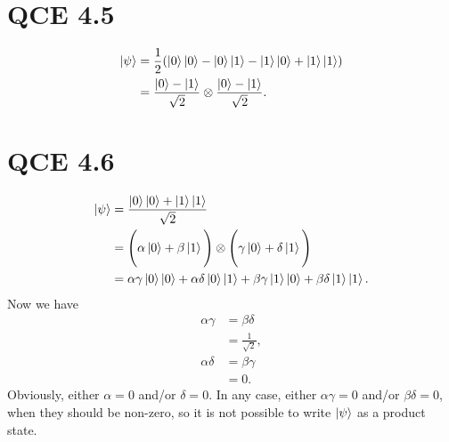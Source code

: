 \documentclass[10pt]{article}
\begin{document}
\section*{QCE 4.5}
\begin{align*}
\ket{\psi} &= \frac{1}{2} ( \ket{0} \ket{0} - \ket{0} \ket{1} - \ket{1} \ket{0} + \ket{1} \ket{1} ) \\
				&= \frac{ \ket{ 0 } - \ket{ 1 } }{\sqrt{2}} \otimes \frac{ \ket{ 0 } - \ket{ 1 } }{\sqrt{2}}.
\end{align*}

\section*{QCE 4.6}
\begin{align*}
\ket{\psi} &= \frac{\ket{0} \ket{0} + \ket{1} \ket{1}}{\sqrt{2}} \\
				&= \Bigg( \alpha \ket{0} + \beta \ket{1} \Bigg) \otimes \Bigg( \gamma \ket{0} + \delta \ket{1} \Bigg) \\
				&= \alpha \gamma \ket{0} \ket{0} + \alpha \delta \ket{0} \ket{1} + \beta \gamma \ket{1} \ket{0} + \beta \delta \ket{1} \ket{1}.
\end{align*}
Now we have
\begin{align*}
\alpha \gamma &= \beta \delta \\
						 &= \frac{1}{\sqrt{2}}, \\
\alpha \delta &= \beta \gamma \\
					  &= 0.
\end{align*}
Obviously, either $\alpha = 0$ and/or $\delta = 0$. In any case, either $\alpha\gamma = 0$ and/or $\beta \delta = 0$, when they should be non-zero, so it is not possible to write $\ket{\psi}$ as a product state.
\end{document}
